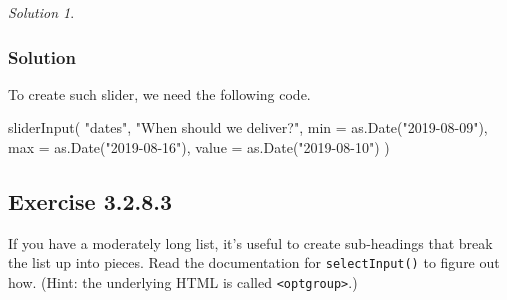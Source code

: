 \documentclass[
]{book}
\newenvironment{Shaded}{\begin{snugshade}}{\end{snugshade}}
\newcommand{\AttributeTok}[1]{\textcolor[rgb]{0.77,0.63,0.00}{#1}}
\newcommand{\FunctionTok}[1]{\textcolor[rgb]{0.00,0.00,0.00}{#1}}
\newcommand{\NormalTok}[1]{#1}
\newcommand{\StringTok}[1]{\textcolor[rgb]{0.31,0.60,0.02}{#1}}
\theoremstyle{definition}
\theoremstyle{definition}
\theoremstyle{definition}
\theoremstyle{definition}
\theoremstyle{remark}
\newtheorem*{solution}{Solution}
\begin{document}
\begin{solution}
\leavevmode

\hypertarget{solution-6}{%
\subsubsection*{Solution}\label{solution-6}}

To create such slider, we need the following code.

\begin{Shaded}
\begin{Highlighting}[]
\FunctionTok{sliderInput}\NormalTok{(}
  \StringTok{"dates"}\NormalTok{,}
  \StringTok{"When should we deliver?"}\NormalTok{,}
  \AttributeTok{min =} \FunctionTok{as.Date}\NormalTok{(}\StringTok{"2019{-}08{-}09"}\NormalTok{),}
  \AttributeTok{max =} \FunctionTok{as.Date}\NormalTok{(}\StringTok{"2019{-}08{-}16"}\NormalTok{),}
  \AttributeTok{value =} \FunctionTok{as.Date}\NormalTok{(}\StringTok{"2019{-}08{-}10"}\NormalTok{)}
\NormalTok{)}
\end{Highlighting}
\end{Shaded}

\end{solution}

\hypertarget{exercise-3.2.8.3}{%
\subsection*{Exercise 3.2.8.3}\label{exercise-3.2.8.3}}

If you have a moderately long list, it's useful to create sub-headings that
break the list up into pieces. Read the documentation for \texttt{selectInput()} to
figure out how. (Hint: the underlying HTML is called \texttt{\textless{}optgroup\textgreater{}}.)
\end{document}
